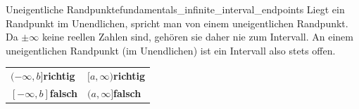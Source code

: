 \begin{KeyPointBox}{Uneigentliche Randpunkte}{fundamentals_infinite_interval_endpoints}
  Liegt ein Randpunkt im Unendlichen, spricht man von einem uneigentlichen Randpunkt.
  Da $\pm \infty$ keine reellen Zahlen sind, gehören sie daher nie zum Intervall.
  An einem uneigentlichen Randpunkt (im Unendlichen) ist ein Intervall also stets offen.

  \begin{center}
    \renewcommand{\arraystretch}{1.45}
    \begin{tabularx}{0.86\linewidth}{@{}>{\centering\arraybackslash}X >{\centering\arraybackslash}X@{}}
      $(-\infty,b]$\quad\textcolor{green!50!black}{\textbf{richtig}}
      & $[a,\infty)$\quad\textcolor{green!50!black}{\textbf{richtig}} \\
      $[-\infty,b]$\quad\textcolor{red!75!black}{\textbf{falsch}}
      & $(a,\infty]$\quad\textcolor{red!75!black}{\textbf{falsch}}
    \end{tabularx}
    \renewcommand{\arraystretch}{1}
  \end{center}
\end{KeyPointBox}
